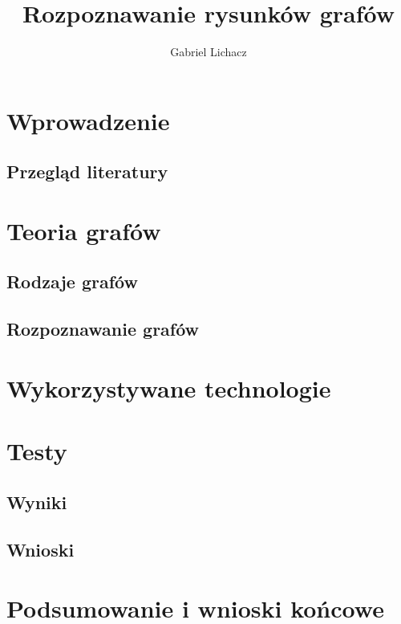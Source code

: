 \documentclass[12pt,twoside]{article}
\author{Gabriel Lichacz}
\title{Rozpoznawanie rysunków grafów}
\begin{document}
\maketitle

\blankpage

\tableofcontents

\clearpage
\blankpage
\clearpage

\section{Wprowadzenie}

\subsection{Przegląd literatury}

\section{Teoria grafów}

\subsection{Rodzaje grafów}

\subsection{Rozpoznawanie grafów}

\section{Wykorzystywane technologie}

\section{Testy}

\subsection{Wyniki}

\subsection{Wnioski}

\section{Podsumowanie i wnioski końcowe}
\end{document}
